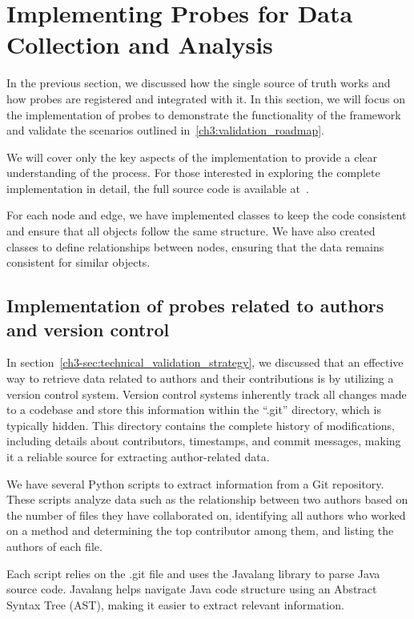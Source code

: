 \section{Implementing Probes for Data Collection and Analysis}\label{sec:probes_implementation}

In the previous section, we discussed how the single source of truth works and how probes are registered and integrated with it. In this section, we will focus on the implementation of probes to demonstrate the functionality of the framework and validate the scenarios outlined in~\ref{ch3:validation_roadmap}.  

We will cover only the key aspects of the implementation to provide a clear understanding of the process. For those interested in exploring the complete implementation in detail, the full source code is available at~\citep{gh_reverse_engr_awan}.

For each node and edge, we have implemented classes to keep the code consistent and ensure that all objects follow the same structure. We have also created classes to define relationships between nodes, ensuring that the data remains consistent for similar objects.

\subsection{Implementation of probes related to authors and version control}

In section~\ref{ch3-sec:technical_validation_strategy}, we discussed that an effective way to retrieve data related to authors and their contributions is by utilizing a version control system. Version control systems inherently track all changes made to a codebase and store this information within the ``.git'' directory, which is typically hidden. This directory contains the complete history of modifications, including details about contributors, timestamps, and commit messages, making it a reliable source for extracting author-related data.

We have several Python scripts to extract information from a Git repository. These scripts analyze data such as the relationship between two authors based on the number of files they have collaborated on, identifying all authors who worked on a method and determining the top contributor among them, and listing the authors of each file.

Each script relies on the .git file and uses the Javalang library \citep{javalang} to parse Java source code. Javalang helps navigate Java code structure using an Abstract Syntax Tree (AST), making it easier to extract relevant information.

